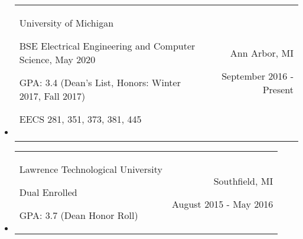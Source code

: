 \documentclass[9pt]{memoir}
\begin{document}
\begin{itemize}

\item

\begin{tabular}[t]{lr}

\begin{minipage}[t]{0.6 \textwidth}
\raggedright

\normalsize
University of Michigan

\small

BSE Electrical Engineering and Computer Science, May 2020

GPA: 3.4 (Dean's List, Honors: Winter 2017, Fall 2017)

EECS 281, 351, 373, 381, 445
\end{minipage}

&

\begin{minipage}[t]{0.3 \textwidth}
\raggedleft

\normalsize
Ann Arbor, MI

\small
September 2016 - Present
\end{minipage}

\\ \\

\end{tabular}

\item

\begin{tabular}[t]{lr}

\begin{minipage}[t]{0.6 \textwidth}
\raggedright

\normalsize
Lawrence Technological University

\small

Dual Enrolled

GPA: 3.7 (Dean Honor Roll)
\end{minipage}

&

\begin{minipage}[t]{0.3 \textwidth}
\raggedleft

\normalsize
Southfield, MI

\small
August 2015 - May 2016
\end{minipage}

\\

\end{tabular}

\end{itemize}
\end{document}
